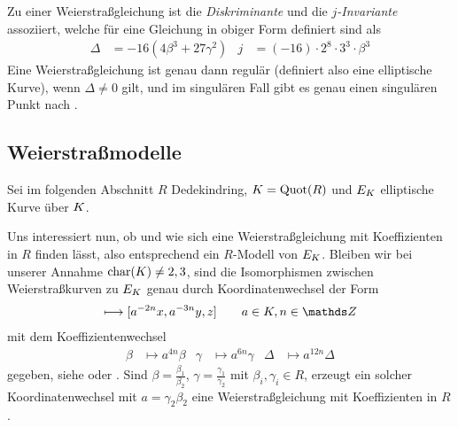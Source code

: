 Zu einer Weierstraßgleichung ist die \emph{Diskriminante} und die
\emph{$j$-Invariante} assoziiert, welche für eine Gleichung in obiger
Form definiert sind als 
\begin{align*}
  \Delta &= -16\left(4\beta^3 + 27\gamma^2\right)
  &j &= (-16)\cdot 2^8\cdot 3^3\cdot\beta^3
\end{align*}
Eine Weierstraßgleichung ist genau dann regulär (definiert also eine
elliptische Kurve), wenn $\Delta\neq 0$ gilt,
und im singulären Fall gibt es genau einen singulären Punkt
nach \cite[Proposition III.1.4]{silverman}.


\subsection{Weierstraßmodelle}
Sei im folgenden Abschnitt $R$ Dedekindring,
$K=\operatorname{Quot}(R)$ und $E_{K}$ elliptische Kurve über $K$.

Uns interessiert nun, ob und wie sich eine Weierstraßgleichung mit
Koeffizienten in $R$ finden lässt, also entsprechend ein $R$-Modell
von $E_{K}$.
Bleiben wir bei unserer Annahme $\operatorname{char}(K)\neq2,3$, sind die
Isomorphismen zwischen Weierstraßkurven zu $E_{K}$ genau durch
Koordinatenwechsel der Form
\begin{gather*}
  [x,y,z] \longmapsto [a^{-2n}x, a^{-3n}y, z] \qquad a\in\K, n\in\Z
\end{gather*}
mit dem Koeffizientenwechsel
\begin{align*}
  \beta&\mapsto a^{4n}\beta
  &\gamma&\mapsto a^{6n}\gamma
  &\Delta&\mapsto a^{12n}\Delta
\end{align*}
gegeben, siehe \cite[1.5, Lemma 2]{neron}
oder \cite[Chapter VII.1]{silverman}.
Sind $\beta=\frac{\beta_1}{\beta_2}$,
$\gamma=\frac{\gamma_1}{\gamma_2}$ mit $\beta_i,\gamma_i\in R$,
erzeugt ein solcher Koordinatenwechsel mit $a=\gamma_2\beta_2$ eine
Weierstraßgleichung mit Koeffizienten in $R$.

